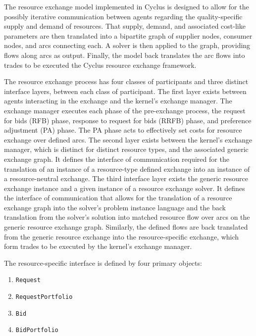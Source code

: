 The resource exchange model implemented in Cyclus is designed to allow for the
possibly iterative communication between agents regarding the quality-specific
supply and demand of resources. That supply, demand, and associated cost-like
parameters are then translated into a bipartite graph of supplier nodes,
consumer nodes, and arcs connecting each. A solver is then applied to the graph,
providing flows along arcs as output. Finally, the model back translates the arc
flows into trades to be executed the Cyclus resource exchange framework.

The resource exchange process has four classes of participants and three
distinct interface layers, between each class of participant. The first layer
exists between agents interacting in the exchange and the kernel's exchange
manager. The exchange manager executes each phase of the pre-exchange process,
the request for bids (RFB) phase, response to request for bids (RRFB) phase, and
preference adjustment (PA) phase. The PA phase acts to effectively set costs for
resource exchange over defined arcs. The second layer exists between the
kernel's exchange manager, which is distinct for distinct resource types, and
the associated generic exchange graph. It defines the interface of communication
required for the translation of an instance of a resource-type defined exchange
into an instance of a resource-neutral exchange. The third interface layer
exists the generic resource exchange instance and a given instance of a resource
exchange solver. It defines the interface of communication that allows for the
translation of a resource exchange graph into the solver's problem instance
language and the back translation from the solver's solution into matched
resource flow over arcs on the generic resource exchange graph. Similarly, the
defined flows are back translated from the generic resource exchange into the
resource-specific exchange, which form trades to be executed by the kernel's
exchange manager.


The resource-specific interface is defined by four primary objects:
\begin{enumerate}
  \item \texttt{Request}
  \item \texttt{RequestPortfolio}
  \item \texttt{Bid}
  \item \texttt{BidPortfolio}
\end{enumerate}


